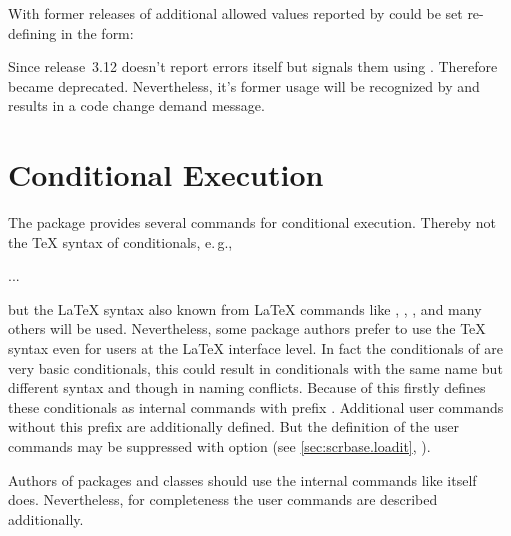 \begin{Declaration}
\end{Declaration}
%
With former releases of 
additional allowed values reported by  could be
set re-defining  in the form:
Since release~3.12  doesn't report errors itself but
signals them using . Therefore 
became deprecated. Nevertheless, it's former usage will be recognized by
 and results in a code change demand message.
%
%


\section{Conditional Execution}
\label{sec:scrbase.if}

The package  provides several commands for conditional
execution. Thereby not the \TeX{} syntax of conditionals, e.\,g.,
\begin{lstcode}[belowskip=\dp\strutbox]
  \iftrue
    ...
  \else
    ...
  \fi
\end{lstcode}
but the \LaTeX{} syntax also known from \LaTeX{} commands like
, , , and many
others will be used. Nevertheless, some package authors prefer to use the
\TeX{} syntax even for users at the \LaTeX{} interface level. In fact the
conditionals of  are very basic conditionals, this could
result in conditionals with the same name but different syntax and though in
naming conflicts. Because of this  firstly defines these
conditionals as internal commands with prefix . Additional user
commands without this prefix are additionally defined. But the definition of
the user commands may be suppressed with option  (see
\autoref{sec:scrbase.loadit}, ).

Authors of packages and classes should use the internal commands like
\KOMAScript{} itself does. Nevertheless, for completeness the user commands
are described additionally.


